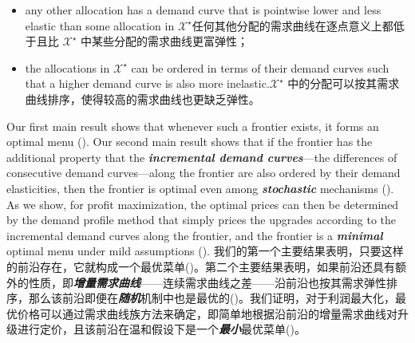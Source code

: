 \documentclass[12pt,letterpaper]{article}
\newenvironment{original}{\color{black}\noindent}{}
\newenvironment{translation}{\color{blue}\noindent}{}
\theoremstyle{plain}
\theoremstyle{definition}
\theoremstyle{remark}
\renewcommand{\1}{\mathds{1}}
\theoremstyle{definition}
\begin{document}
\begin{itemize}
    \item[\textit{(i)}] \begin{original}any other allocation has a demand curve that is pointwise lower and less elastic than some allocation in $\mathcal{X}^\star$\end{original}\begin{translation}任何其他分配的需求曲线在逐点意义上都低于且比 $\mathcal{X}^\star$ 中某些分配的需求曲线更富弹性；\end{translation}
    \item[\textit{(ii)}] \begin{original}the allocations in $\mathcal{X}^\star$ can be ordered in terms of their demand curves such that a higher demand curve is also more inelastic.\end{original}\begin{translation}$\mathcal{X}^\star$ 中的分配可以按其需求曲线排序，使得较高的需求曲线也更缺乏弹性。\end{translation}
\end{itemize}

\begin{original}
Our first main result shows that whenever such a frontier exists, it forms an optimal menu (). Our second main result shows that if the frontier has the additional property that the \textit{\textbf{incremental demand curves}}---the differences of consecutive demand curves---along the frontier are also ordered by their demand elasticities, then the frontier is optimal even among \textit{\textbf{stochastic}} mechanisms (). As we show, for profit maximization, the optimal prices can then be determined by the demand profile method that simply prices the upgrades according to the incremental demand curves along the frontier, and the frontier is a \textit{\textbf{minimal}} optimal menu under mild assumptions ().
\end{original}
\begin{translation}
我们的第一个主要结果表明，只要这样的前沿存在，它就构成一个最优菜单()。第二个主要结果表明，如果前沿还具有额外的性质，即\textit{\textbf{增量需求曲线}}——连续需求曲线之差——沿前沿也按其需求弹性排序，那么该前沿即便在\textit{\textbf{随机}}机制中也是最优的()。我们证明，对于利润最大化，最优价格可以通过需求曲线族方法来确定，即简单地根据沿前沿的增量需求曲线对升级进行定价，且该前沿在温和假设下是一个\textit{\textbf{最小}}最优菜单()。
\end{translation}
\end{document}
